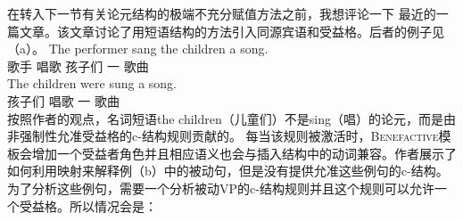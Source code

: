     在转入下一节有关论元结构的极端不充分赋值方法之前，我想评论一下 \citet*{AGT2014a}最近的一篇文章。该文章讨论了用短语结构的方法引入同源宾语和受益格。后者的例子见（a）。
\eal
\ex 
\gll The performer sang the children a song.\\
      歌手 唱歌  孩子们 一 歌曲\\
\ex 
\gll The children were sung a song.\\
      孩子们 \passivepst{} 唱歌 一 歌曲\\
\zl
按照作者的观点，名词短语the children（儿童们）不是sing（唱）的论元，而是由非强制性允准受益格的c-结构规则贡献的。
\ea\label{c-struc-vp-benefactive}
\z
每当该规则被激活时，\textsc{Benefactive}模板会增加一个受益者角色并且相应语义也会与插入结构中的动词兼容。作者展示了如何利用映射来解释例（b）中的被动句，但是没有提供允准这些例句的c-结构。为了分析这些例句，需要一个分析被动VP的c-结构规则并且这个规则可以允许一个受益格。所以情况会是：
